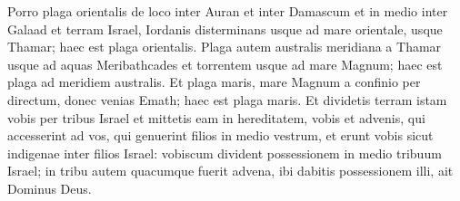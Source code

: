 \begin{biblechapter}
\verse Porro plaga orientalis de loco inter Auran et inter Damascum et in medio inter Galaad et terram Israel, Iordanis disterminans usque ad mare orientale, usque Thamar; haec est plaga orientalis. 
\verse Plaga autem australis meridiana a Thamar usque ad aquas Meribathcades et torrentem usque ad mare Magnum; haec est plaga ad meridiem australis. 
\verse Et plaga maris, mare Magnum a confinio per directum, donec venias Emath; haec est plaga maris. 
\verse Et dividetis terram istam vobis per tribus Israel 
\verse et mittetis eam in hereditatem, vobis et advenis, qui accesserint ad vos, qui genuerint filios in medio vestrum, et erunt vobis sicut indigenae inter filios Israel: vobiscum divident possessionem in medio tribuum Israel; 
\verse in tribu autem quacumque fuerit advena, ibi dabitis possessionem illi, ait Dominus Deus. 
\end{biblechapter}


